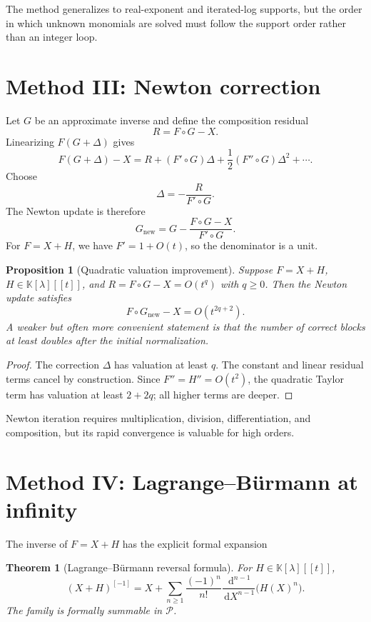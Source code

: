 \documentclass[11pt,openany]{book}
\theoremstyle{definition}
\theoremstyle{plain}
\newtheorem{theorem}{Theorem}[chapter]
\newtheorem{proposition}{Proposition}[chapter]
\theoremstyle{remark}
\newcommand{\K}{\mathbb{K}}
\newcommand{\Plog}{\mathscr{P}}
\newcommand{\dd}{\,\mathrm{d}}
\newcommand{\invcomp}{^{[-1]}}
\begin{document}
The method generalizes to real-exponent and iterated-log supports, but the order in which unknown monomials are solved must follow the support order rather than an integer loop.

\section{Method III: Newton correction}
Let \(G\) be an approximate inverse and define the composition residual
\begin{equation}\label{eq:inverse-residual}
 R=F\circ G-X.
\end{equation}
Linearizing \(F(G+\Delta)\) gives
\[
 F(G+\Delta)-X
 =R+(F'\circ G)\Delta+\frac12(F''\circ G)\Delta^2+\cdots.
\]
Choose
\begin{equation}\label{eq:newton-composition}
 \Delta=-\frac{R}{F'\circ G}.
\end{equation}
The Newton update is therefore
\begin{equation}\label{eq:newton-reversion}
 G_{\mathrm{new}}
 =G-\frac{F\circ G-X}{F'\circ G}.
\end{equation}
For \(F=X+H\), we have \(F'=1+O(t)\), so the denominator is a unit.

\begin{proposition}[Quadratic valuation improvement]\label{prop:newton-improvement}
Suppose \(F=X+H\), \(H\in\K[\lambda][[t]]\), and \(R=F\circ G-X=O(t^q)\) with \(q\ge0\). Then the Newton update satisfies
\begin{equation}\label{eq:newton-improvement}
 F\circ G_{\mathrm{new}}-X=O(t^{2q+2}).
\end{equation}
A weaker but often more convenient statement is that the number of correct blocks at least doubles after the initial normalization.
\end{proposition}

\begin{proof}
The correction \(\Delta\) has valuation at least \(q\). The constant and linear residual terms cancel by construction. Since \(F''=H''=O(t^2)\), the quadratic Taylor term has valuation at least \(2+2q\); all higher terms are deeper.
\end{proof}

Newton iteration requires multiplication, division, differentiation, and composition, but its rapid convergence is valuable for high orders.

\section{Method IV: Lagrange--B\"urmann at infinity}
The inverse of \(F=X+H\) has the explicit formal expansion
\begin{theorem}[Lagrange--B\"urmann reversal formula]\label{thm:lagrange-infinity}
For \(H\in\K[\lambda][[t]]\),
\begin{equation}\label{eq:lagrange-infinity}
 (X+H)\invcomp
 =X+\sum_{n\ge1}\frac{(-1)^n}{n!}
 \frac{\dd^{n-1}}{\dd X^{n-1}}\bigl(H(X)^n\bigr).
\end{equation}
The family is formally summable in \(\Plog\).
\end{theorem}
\end{document}
